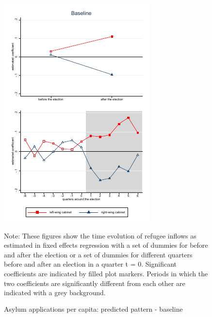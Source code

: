 \documentclass[a4paper,12pt]{article}
\begin{document}
\begin{figure}
	\caption{Asylum applications per capita: predicted pattern - baseline}
	\centering
	\label{main_results_app}
	\begin{minipage}{0.8\textwidth} 
		\includegraphics[width=\linewidth]{../results/applications/app_graphs_baseline.pdf}
		{\scriptsize Note: These figures show the time evolution of refugee inflows as estimated in fixed effects regression with a set of dummies for before and after the election or a set of dummies for different quarters before and after an election in a quarter t = 0. Significant coefficients are indicated by filled plot markers. Periods in which the two coefficients are significantly different from each other are indicated with a grey background.\par}
	\end{minipage}
\end{figure}
\end{document}
